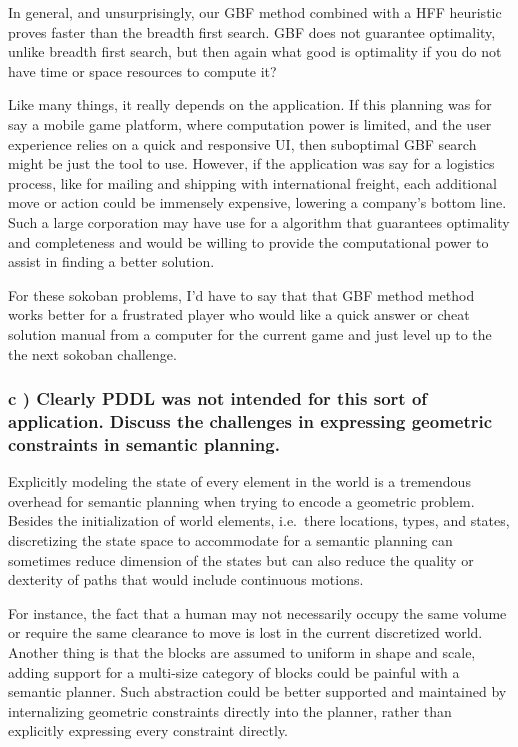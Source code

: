 \documentclass{article}
\begin{document}
    In general, and unsurprisingly, our GBF method combined with a HFF
heuristic proves faster than the breadth first search. GBF does not
guarantee optimality, unlike breadth first search, but then again what
good is optimality if you do not have time or space resources to compute
it?

Like many things, it really depends on the application. If this planning
was for say a mobile game platform, where computation power is limited,
and the user experience relies on a quick and responsive UI, then
suboptimal GBF search might be just the tool to use. However, if the
application was say for a logistics process, like for mailing and
shipping with international freight, each additional move or action
could be immensely expensive, lowering a company's bottom line. Such a
large corporation may have use for a algorithm that guarantees
optimality and completeness and would be willing to provide the
computational power to assist in finding a better solution.

For these sokoban problems, I'd have to say that that GBF method method
works better for a frustrated player who would like a quick answer or
cheat solution manual from a computer for the current game and just
level up to the the next sokoban challenge.


    \subsubsection{c ) Clearly PDDL was not intended for this sort of application. Discuss
the challenges in expressing geometric constraints in semantic planning.}


    Explicitly modeling the state of every element in the world is a
tremendous overhead for semantic planning when trying to encode a
geometric problem. Besides the initialization of world elements,
i.e.~there locations, types, and states, discretizing the state space to
accommodate for a semantic planning can sometimes reduce dimension of
the states but can also reduce the quality or dexterity of paths that
would include continuous motions.

For instance, the fact that a human may not necessarily occupy the same
volume or require the same clearance to move is lost in the current
discretized world. Another thing is that the blocks are assumed to
uniform in shape and scale, adding support for a multi-size category of
blocks could be painful with a semantic planner. Such abstraction could
be better supported and maintained by internalizing geometric
constraints directly into the planner, rather than explicitly expressing
every constraint directly.
\end{document}
